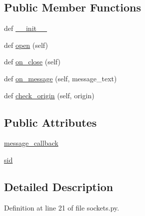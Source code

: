 \subsection*{Public Member Functions}
\begin{DoxyCompactItemize}
\item 
def \hyperlink{classparlai_1_1chat__service_1_1services_1_1websocket_1_1sockets_1_1MessageSocketHandler_afae9fa75381c0bdd28fe19765bba5ede}{\+\_\+\+\_\+init\+\_\+\+\_\+}
\item 
def \hyperlink{classparlai_1_1chat__service_1_1services_1_1websocket_1_1sockets_1_1MessageSocketHandler_a3b5c9e9fc500c312e1895c6220d52ca7}{open} (self)
\item 
def \hyperlink{classparlai_1_1chat__service_1_1services_1_1websocket_1_1sockets_1_1MessageSocketHandler_ac86fc08a0abf8acabaab0949d579ffb1}{on\+\_\+close} (self)
\item 
def \hyperlink{classparlai_1_1chat__service_1_1services_1_1websocket_1_1sockets_1_1MessageSocketHandler_a6e45176bf280b1c9b90b93f933af5e00}{on\+\_\+message} (self, message\+\_\+text)
\item 
def \hyperlink{classparlai_1_1chat__service_1_1services_1_1websocket_1_1sockets_1_1MessageSocketHandler_a3f2a94972e7e7564c361b4045983ab35}{check\+\_\+origin} (self, origin)
\end{DoxyCompactItemize}
\subsection*{Public Attributes}
\begin{DoxyCompactItemize}
\item 
\hyperlink{classparlai_1_1chat__service_1_1services_1_1websocket_1_1sockets_1_1MessageSocketHandler_ae97ee5ffb1b97863c68c32bbe89cde5e}{message\+\_\+callback}
\item 
\hyperlink{classparlai_1_1chat__service_1_1services_1_1websocket_1_1sockets_1_1MessageSocketHandler_a5e574f1ab05ba9d4749f4d4c2fe6e6d2}{sid}
\end{DoxyCompactItemize}


\subsection{Detailed Description}


Definition at line 21 of file sockets.\+py.



